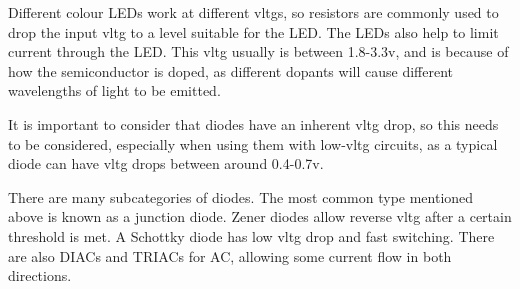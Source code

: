 \documentclass[a4paper,11pt]{report}
\begin{document}
Different colour LEDs work at different \gls{vltg}s, so resistors are commonly used to drop the input \gls{vltg} to a level suitable for the LED. The LEDs also help to limit current through the LED. This \gls{vltg} usually is between 1.8-3.3v, and is because of how the semiconductor is doped, as different dopants will cause different wavelengths of light to be emitted.

It is important to consider that diodes have an inherent \gls{vltg} drop, so this needs to be considered, especially when using them with low-\gls{vltg} circuits, as a typical diode can have \gls{vltg} drops between around 0.4-0.7v.

There are many subcategories of diodes. The most common type mentioned above is known as a junction diode. Zener diodes allow reverse \gls{vltg} after a certain threshold is met. A Schottky diode has low \gls{vltg} drop and fast switching. There are also DIACs and TRIACs for AC, allowing some current flow in both directions.
\end{document}
